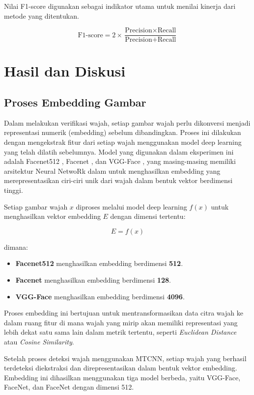 \documentclass[a4paper, 11pt]{article}
\begin{document}
Nilai F1-score digunakan sebagai indikator utama untuk menilai kinerja dari metode yang ditentukan.

\[
\text{F1-score} = 2 \times \frac{\text{Precision} \times \text{Recall}}{\text{Precision} + \text{Recall}}
\]

\section{Hasil dan Diskusi}




\subsection{Proses Embedding Gambar}

Dalam melakukan verifikasi wajah, setiap gambar wajah perlu dikonversi menjadi representasi numerik (embedding) sebelum dibandingkan. Proses ini dilakukan dengan mengekstrak fitur dari setiap wajah menggunakan model deep learning yang telah dilatih sebelumnya. Model yang digunakan dalam eksperimen ini adalah Facenet512 , Facenet , dan VGG-Face , yang masing-masing memiliki arsitektur Neural NetwoRk dalam untuk menghasilkan embedding yang merepresentasikan ciri-ciri unik dari wajah dalam bentuk vektor berdimensi tinggi.

Setiap gambar wajah \( x \) diproses melalui model deep learning \( f(x) \) untuk menghasilkan vektor embedding \( E \) dengan dimensi tertentu:

\begin{equation}
E = f(x)
\end{equation}

dimana:
\begin{itemize}
    \item \textbf{Facenet512} menghasilkan embedding berdimensi \textbf{512}.
    \item \textbf{Facenet} menghasilkan embedding berdimensi \textbf{128}.
    \item \textbf{VGG-Face} menghasilkan embedding berdimensi \textbf{4096}.
\end{itemize}

Proses embedding ini bertujuan untuk mentransformasikan data citra wajah ke dalam ruang fitur di mana wajah yang mirip akan memiliki representasi yang lebih dekat satu sama lain dalam metrik tertentu, seperti \textit{Euclidean Distance} atau \textit{Cosine Similarity}. 

Setelah proses deteksi wajah menggunakan MTCNN, setiap wajah yang berhasil terdeteksi diekstraksi dan direpresentasikan dalam bentuk vektor embedding. Embedding ini dihasilkan menggunakan tiga model berbeda, yaitu VGG-Face, FaceNet, dan FaceNet dengan dimensi 512.
\end{document}
